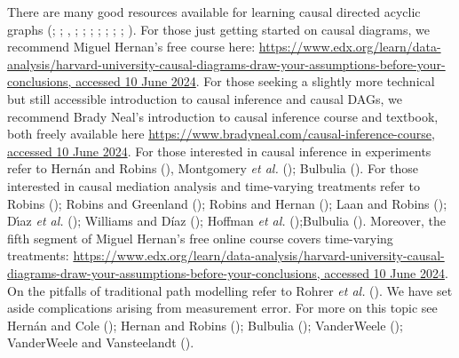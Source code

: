 \documentclass[
  singlecolumn]{article}
\begin{document}
There are many good resources available for learning causal directed
acyclic graphs (;
;
,
;
;
;
;
;
; ; ). For those
just getting started on causal diagrams, we recommend Miguel Hernan's
free course here:
\href{https://www.edx.org/learn/data-analysis/harvard-university-causal-diagrams-draw-your-assumptions-before-your-conclusions}{https://www.edx.org/learn/data-analysis/harvard-university-causal-diagrams-draw-your-assumptions-before-your-conclusions,
accessed 10 June 2024}. For those seeking a slightly more technical but
still accessible introduction to causal inference and causal DAGs, we
recommend Brady Neal's introduction to causal inference course and
textbook, both freely available here
\href{https://www.bradyneal.com/causal-inference-course}{https://www.bradyneal.com/causal-inference-course,
accessed 10 June 2024}. For those interested in causal inference in
experiments refer to Hernán and Robins
(), Montgomery \emph{et al.}
(); Bulbulia
(). For those interested
in causal mediation analysis and time-varying treatments refer to Robins
(); Robins and Greenland
(); Robins and Hernan
(); Laan and Robins
(); Dı́az
\emph{et al.} (); Williams and
Díaz (); Hoffman \emph{et al.}
();Bulbulia
(). Moreover, the fifth
segment of Miguel Hernan's free online course covers time-varying
treatments:
\href{https://www.edx.org/learn/data-analysis/harvard-university-causal-diagrams-draw-your-assumptions-before-your-conclusions}{https://www.edx.org/learn/data-analysis/harvard-university-causal-diagrams-draw-your-assumptions-before-your-conclusions,
accessed 10 June 2024}. On the pitfalls of traditional path modelling
refer to Rohrer \emph{et al.} (). We
have set aside complications arising from measurement error. For more on
this topic see Hernán and Cole
(); Hernan and Robins
(); Bulbulia
(); VanderWeele
(); VanderWeele and Vansteelandt
().
\end{document}
